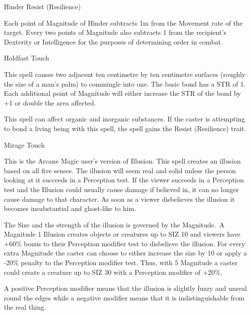 \begin{samepage}
\begin{rpg-spell}
{Hinder}
{Resist (Resilience)}

Each point of Magnitude of Hinder subtracts 1m from the Movement rate of the target. Every two points of Magnitude also subtracts 1 from the recipient’s Dexterity or Intelligence for the purposes of determining order in combat. 
\end{rpg-spell}
\end{samepage}


\begin{samepage}
\begin{rpg-spell}
{Holdfast}
{Touch}

This spell causes two adjacent ten centimetre by ten centimetre surfaces (roughly the size of a man’s palm) to commingle into one. The basic bond has a STR of 1. Each additional point of Magnitude will either increase the STR of the bond by +1 or double the area affected. 

This spell can affect organic and inorganic substances. If the caster is attempting to bond a living being with this spell, the spell gains the Resist (Resilience) trait.
\end{rpg-spell}
\end{samepage}


\begin{samepage}
\begin{rpg-spell}
{Mirage}
{Touch}

This is the Arcane Magic user’s version of Illusion. This spell creates an illusion based on all five senses. The illusion will seem real and solid unless the person looking at it succeeds in a Perception test. If the viewer succeeds in a Perception test and the Illusion could usually cause damage if believed in, it can no longer cause damage to that character. As soon as a viewer disbelieves the illusion it becomes insubstantial and ghost-like to him.

The Size and the strength of the illusion is governed by the Magnitude. A Magnitude 1 Illusion creates objects or creatures up to SIZ 10 and viewers have +60\% bonus to their Perception modifier test to disbelieve the illusion. For every extra Magnitude the caster can choose to either increase the size by 10 or apply a -20\% penalty to the Perception modifier test. Thus, with 5 Magnitude a caster could create a creature up to SIZ 30 with a Perception modifier of +20\%.
	
A positive Perception modifier means that the illusion is slightly fuzzy and unreal round the edges while a negative modifier means that it is indistinguishable from the real thing.
\end{rpg-spell}
\end{samepage}


